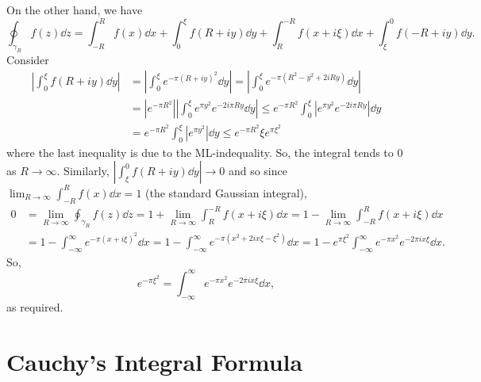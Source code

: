 \documentclass[
]{article}
\theoremstyle{definition}
\theoremstyle{definition}
\begin{document}
\begin{center}

\end{center}

On the other hand, we have
\[\oint_{\gamma_R} f(z) \dd z = \int_{-R}^R f(x) \dd x + 
  \int_0^\xi f(R + iy) \dd y + \int_R^{-R} f(x + i\xi) \dd x
  + \int_\xi^0 f(-R + iy) \dd y.\] Consider \[\begin{split}
  \left| \int_0^\xi f(R + iy) \dd y \right| 
    & = \left|\int_0^\xi e^{-\pi(R + iy)^2} \dd y\right|
      = \left|\int_0^\xi e^{-\pi (R^2 - y^2 + 2iRy)} \dd y\right|\\
    & = |e^{-\pi R^2}| \left|\int_0^\xi e^{\pi y^2}e^{- 2i\pi Ry} \dd y\right|
      \le e^{-\pi R^2} \int_0^\xi |e^{\pi y^2}e^{- 2i\pi Ry}| \dd y\\
    & = e^{-\pi R^2} \int_0^\xi |e^{\pi y^2}| \dd y 
      \le  e^{-\pi R^2} \xi e^{\pi \xi^2}
\end{split}\] where the last inequality is due to the ML-indequality.
So, the integral tends to 0 as \(R \to \infty\). Similarly,
\(\left| \int_\xi^0 f(R + iy) \dd y \right| \to 0\) and so since
\(\lim_{R \to \infty} \int_{-R}^R f(x) \dd x = 1\) (the standard
Gaussian integral), \[\begin{split}
  0 & = \lim_{R \to \infty} \oint_{\gamma_R} f(z) \dd z 
      = 1 + \lim_{R \to \infty}\int_R^{-R} f(x + i\xi) \dd x 
      = 1 - \lim_{R \to \infty}\int_{-R}^{R} f(x + i\xi) \dd x \\
    & = 1 - \int_{-\infty}^\infty e^{-\pi(x + i\xi)^2}\dd x 
      = 1 - \int_{-\infty}^\infty e^{-\pi(x^2 + 2ix\xi - \xi^2)}\dd x
      = 1 - e^{\pi \xi^2}\int_{-\infty}^\infty e^{-\pi x^2} e^{-2\pi i x\xi}\dd x.
\end{split}\] So,
\[e^{-\pi \xi^2} = \int_{-\infty}^\infty e^{-\pi x^2} e^{-2\pi i x\xi}\dd x,\]
as required.

\newpage

\hypertarget{cauchys-integral-formula}{%
\section{Cauchy's Integral Formula}\label{cauchys-integral-formula}}
\end{document}
